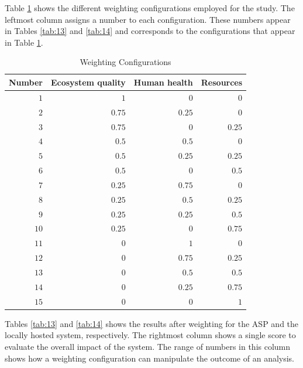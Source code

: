 \documentclass[final,journal,10pt,letterpaper,oneside,twocolumn,compsoc]%
{IEEEtran}
\begin{document}
Table \ref{tab:12} shows the different weighting configurations employed for the
study.
The leftmost column assigns a number to each configuration. These
numbers appear in Tables \ref{tab:13} and \ref{tab:14} and corresponds to the
configurations that appear in Table \ref{tab:12}.

\begin{table}[t!]
  \caption{Weighting Configurations}
  \label{tab:12}
  \centering
    \begin{tabular}{| r | r | r | r |}
      \hline
      Number & Ecosystem quality & Human health & Resources \\
      \hline
      $1$  & $1$    & $0$    & $0$    \\
      $2$  & $0.75$ & $0.25$ & $0$    \\
      $3$  & $0.75$ & $0$    & $0.25$ \\
      $4$  & $0.5$  & $0.5$  & $0$    \\
      $5$  & $0.5$  & $0.25$ & $0.25$ \\
      $6$  & $0.5$  & $0$    & $0.5$  \\
      $7$  & $0.25$ & $0.75$ & $0$    \\
      $8$  & $0.25$ & $0.5$  & $0.25$ \\
      $9$  & $0.25$ & $0.25$ & $0.5$  \\
      $10$ & $0.25$ & $0$    & $0.75$ \\
      $11$ & $0$    & $1$    & $0$    \\
      $12$ & $0$    & $0.75$ & $0.25$ \\
      $13$ & $0$    & $0.5$  & $0.5$  \\
      $14$ & $0$    & $0.25$ & $0.75$ \\
      $15$ & $0$    & $0$    & $1$    \\
      \hline
    \end{tabular}
\end{table}

Tables \ref{tab:13} and \ref{tab:14} shows the results after weighting for the ASP and the locally
hosted system, respectively. The rightmost column shows a single score to
evaluate the overall impact of the system. The range of numbers in this column
shows how a weighting configuration can manipulate the outcome of an analysis.
\end{document}
